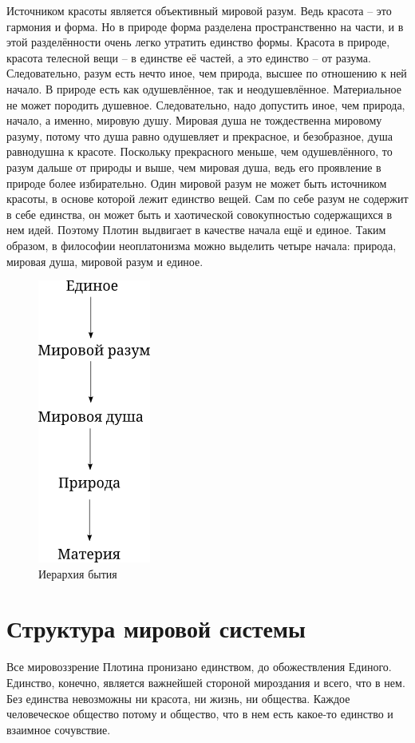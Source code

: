 \documentclass[a4paper,12pt]{article}
\begin{document}
\medskip 
Источником красоты является объективный мировой разум. Ведь красота – это гармония и форма. Но в природе форма разделена пространственно на части, и в этой разделённости очень легко утратить единство формы. Красота в природе, красота телесной вещи – в единстве её частей, а это единство – от разума. Следовательно, разум есть нечто иное, чем природа, высшее по отношению к ней начало. 
В природе есть как одушевлённое, так и неодушевлённое. Материальное не может породить душевное. Следовательно, надо допустить иное, чем природа, начало, а именно, мировую душу. Мировая душа не тождественна мировому разуму, потому что душа равно одушевляет и прекрасное, и безобразное, душа равнодушна к красоте. Поскольку прекрасного меньше, чем одушевлённого, то разум дальше от природы и выше, чем мировая душа, ведь его проявление в природе более избирательно.
Один мировой разум не может быть источником красоты, в основе которой лежит единство вещей. Сам по себе разум не содержит в себе единства, он может быть и хаотической совокупностью содержащихся в нем идей. Поэтому Плотин выдвигает в качестве начала ещё и единое. Таким образом, в философии неоплатонизма можно выделить четыре начала: природа, мировая душа, мировой разум и единое.

\newpage
\begin{figure}[h]
	\begin{center}
		\includegraphics[scale=0.9]{images/sc_ph1.png}
		\caption{Иерархия бытия}
	\end{center}	
\end{figure}
\part{Структура мировой системы}
Все мировоззрение Плотина пронизано единством, до обожествления Единого. Единство, конечно, является важнейшей стороной мироздания и всего, что в нем. Без единства невозможны ни красота, ни жизнь, ни общества. Каждое человеческое общество потому и общество, что в нем есть какое-то единство и взаимное сочувствие.\\
\end{document}
